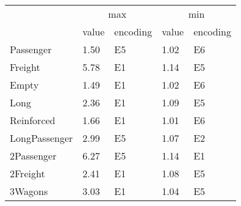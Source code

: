 \begin{tabular}{lllll}
\toprule
 & \multicolumn{2}{c}{max} & \multicolumn{2}{c}{min} \\
 & value & encoding & value & encoding \\
\midrule
Passenger & 1.50 & E5 & 1.02 & E6 \\
Freight & 5.78 & E1 & 1.14 & E5 \\
Empty & 1.49 & E1 & 1.02 & E6 \\
Long & 2.36 & E1 & 1.09 & E5 \\
Reinforced & 1.66 & E1 & 1.01 & E6 \\
LongPassenger & 2.99 & E5 & 1.07 & E2 \\
2Passenger & 6.27 & E5 & 1.14 & E1 \\
2Freight & 2.41 & E1 & 1.08 & E5 \\
3Wagons & 3.03 & E1 & 1.04 & E5 \\
\bottomrule
\end{tabular}
